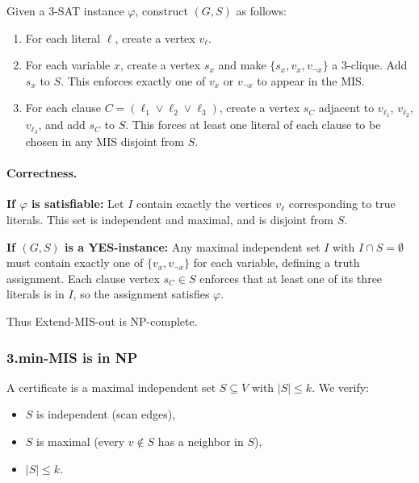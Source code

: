 \documentclass[9pt]{extarticle}
\begin{document}
Given a 3-SAT instance $\varphi$, construct $(G,S)$ as follows:

\begin{enumerate}
    \item For each literal $\ell$, create a vertex $v_\ell$.
    \item For each variable $x$, create a vertex $s_x$ and make  
          $\{s_x, v_x, v_{\neg x}\}$ a 3-clique.  
          Add $s_x$ to $S$.  
          This enforces exactly one of $v_x$ or $v_{\neg x}$ to appear in the MIS.
    \item For each clause $C=(\ell_1\lor\ell_2\lor\ell_3)$, create a vertex $s_C$  
          adjacent to $v_{\ell_1}$, $v_{\ell_2}$, $v_{\ell_3}$, and add $s_C$ to $S$.  
          This forces at least one literal of each clause to be chosen in any MIS disjoint from $S$.
\end{enumerate}

\paragraph{Correctness.}

\textbf{If $\varphi$ is satisfiable:}  
Let $I$ contain exactly the vertices $v_\ell$ corresponding to true literals.  
This set is independent and maximal, and is disjoint from $S$.

\textbf{If $(G,S)$ is a YES-instance:}  
Any maximal independent set $I$ with $I\cap S=\emptyset$ must contain exactly one of  
$\{v_x, v_{\neg x}\}$ for each variable, defining a truth assignment.  
Each clause vertex $s_C\in S$ enforces that at least one of its three literals is in $I$,  
so the assignment satisfies $\varphi$.

Thus Extend-MIS-out is NP-complete.


\subsubsection*{3.\quad min-MIS is in NP}

A certificate is a maximal independent set $S\subseteq V$ with $|S|\le k$.  
We verify:

\begin{itemize}
    \item $S$ is independent (scan edges),
    \item $S$ is maximal (every $v\notin S$ has a neighbor in $S$),
    \item $|S|\le k$.
\end{itemize}
\end{document}
